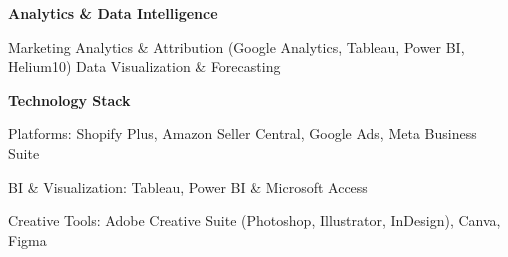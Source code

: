 \documentclass[10pt,letterpaper]{article}
\begin{document}
\textbf{Analytics \& Data Intelligence}

\begin{subitemize}
\item Marketing Analytics \& Attribution (Google Analytics, Tableau, Power BI, Helium10) \textbar{} Data Visualization \& Forecasting
\end{subitemize}

\textbf{Technology Stack}

\begin{subitemize}
\item Platforms: Shopify Plus, Amazon Seller Central, Google Ads, Meta Business Suite
\item BI \& Visualization: Tableau, Power BI \& Microsoft Access
\item Creative Tools: Adobe Creative Suite (Photoshop, Illustrator, InDesign), Canva, Figma
\end{subitemize}
\end{document}
